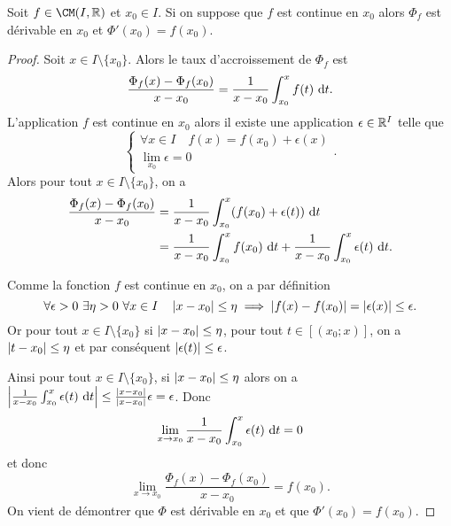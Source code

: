 \begin{prop}
  Soit $f \in \CM(I,\R)$ et $x_0 \in I$. Si on suppose que $f$ est continue en $x_0$ alors $\Phi_f$ est dérivable en $x_0$ et $\Phi'(x_0)=f(x_0)$.
\end{prop}
\begin{proof}
  Soit $x \in I \setminus\{x_0\}$. Alors le taux d'accroissement de $\Phi_f$ est
  \begin{equation}
    \frac{\Phi_f(x)-\Phi_f(x_0)}{x-x_0} = \frac{1}{x-x_0} \int_{x_0}^x f(t)\,\mathop{}\mathopen{}\mathrm{d} t.
  \end{equation}
  L'application $f$ est continue en $x_0$ alors il existe une application $\epsilon \in \mathbb{R}^I$ telle que
  \begin{equation}
    \begin{cases} \forall x \in I \quad f(x)=f(x_0)+\epsilon(x) \\ \lim\limits_{x_0} \epsilon =0 \end{cases}.
  \end{equation}
  Alors pour tout $x \in I \setminus\{x_0\}$, on a
  \begin{align}
    \frac{\Phi_f(x)-\Phi_f(x_0)}{x-x_0} &= \frac{1}{x-x_0} \int_{x_0}^x (f(x_0)+\epsilon(t))\,\mathop{}\mathopen{}\mathrm{d} t \\
    &=  \frac{1}{x-x_0} \int_{x_0}^x f(x_0)\,\mathop{}\mathopen{}\mathrm{d} t + \frac{1}{x-x_0} \int_{x_0}^x\epsilon(t)\,\mathop{}\mathopen{}\mathrm{d} t.
  \end{align}

  Comme la fonction $f$ est continue en $x_0$, on a par définition
  \begin{equation}
    \forall \epsilon >0 \ \exists \eta>0 \ \forall x \in I \quad \left\lvert x-x_0\right\rvert \leq \eta \implies \left\lvert f(x)-f(x_0)\right\rvert = \left\lvert\epsilon(x)\right\rvert \leq \epsilon.
  \end{equation}
  Or pour tout $x \in I \setminus\{x_0\}$ si $\left\lvert x-x_0\right\rvert\leq \eta$, pour tout $t \in [(x_0;x)]$, on a $\left\lvert t-x_0\right\rvert \leq \eta$ et par conséquent $\left\lvert\epsilon(t)\right\rvert\leq \epsilon$.

  Ainsi pour tout $x \in I \setminus\{x_0\}$, si $\left\lvert x-x_0\right\rvert\leq \eta$ alors on a $\left\lvert\frac{1}{x-x_0} \int_{x_0}^x\epsilon(t)\,\mathop{}\mathopen{}\mathrm{d} t\right\rvert \leq \frac{\left\lvert x-x_0\right\rvert}{\left\lvert x-x_0\right\rvert}\epsilon=\epsilon$. Donc
  \begin{equation}
    \lim\limits_{x \to x_0} \frac{1}{x-x_0} \int_{x_0}^x\epsilon(t)\,\mathop{}\mathopen{}\mathrm{d} t=0
  \end{equation}
  et donc
  \begin{equation}
    \lim\limits_{x \to x_0}\frac{\Phi_f(x)-\Phi_f(x_0)}{x-x_0} =f(x_0).
  \end{equation}
  On vient de démontrer que $\Phi$ est dérivable en $x_0$ et que $\Phi'(x_0)=f(x_0)$.
\end{proof}


